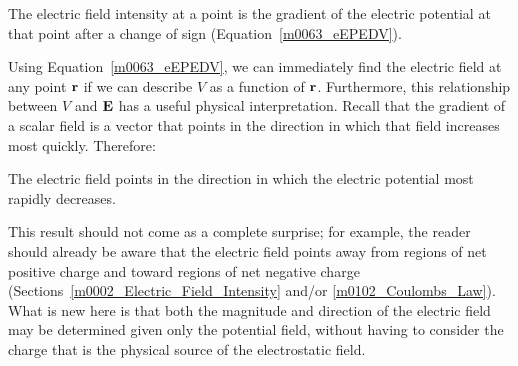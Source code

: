 \begin{mdframed}[backgroundcolor=yellow!20,nobreak=true] 
The electric field intensity at a point is the gradient of the electric potential at that point after a change of sign (Equation~\ref{m0063_eEPEDV}).
\end{mdframed}

Using Equation~\ref{m0063_eEPEDV}, we can immediately find the electric field at any point ${\bf r}$ if we can describe $V$ as a function of ${\bf r}$.  
Furthermore, this relationship between $V$ and ${\bf E}$ has a useful physical interpretation.
Recall that the gradient of a scalar field is a vector that points in the direction in which that field increases most quickly. 
Therefore:
%
\begin{mdframed}[backgroundcolor=yellow!20,nobreak=true] 
The electric field points in the direction in which the electric potential most rapidly decreases.
\end{mdframed}
%
This result should not come as a complete surprise; for example, the reader should already be aware that the electric field points away from regions of net positive charge and toward regions of net negative charge (Sections~\ref{m0002_Electric_Field_Intensity} and/or \ref{m0102_Coulombs_Law}).
What is new here is that both the magnitude and direction of the electric field may be determined given only the potential field, without having to consider the charge that is the physical source of the electrostatic field.


